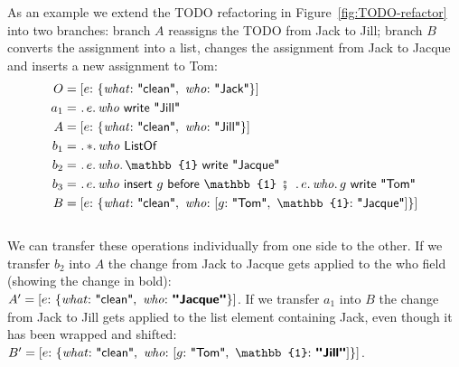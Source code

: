 \documentclass[english,submission]{programming}
\theoremstyle{definition}
\newcommand{\mathbox}[1]{\colorbox{black!10}{$#1$}}
\DeclareMathOperator{\exec}{\ \fatsemi\ \ }
\newcommand{\is}{{:}\ }
\newcommand{\comma}{,\ }
\newcommand{\quotedstring}[1]{\textsf{\textquotedbl{#1}\textquotedbl}}
\begin{document}
As an example we extend the TODO refactoring in Figure~\ref{fig:TODO-refactor} into two branches: branch $A$ reassigns the TODO from Jack to Jill; branch $B$ converts the assignment into a list, changes the assignment from Jack to Jacque and inserts a new assignment to Tom:
\begin{align*}
  O &= [
    e \is \{ \mathit{what}\is \quotedstring{clean}\comma  \mathit{who}\is \quotedstring{Jack} \}
    ] \\
  a_1 &= \ \ldotp e\ldotp\mathit{who}\textsf{ write } \quotedstring{Jill}\\
  A &= [
    e \is \{ \mathit{what}\is \quotedstring{clean}\comma  \mathit{who}\is \quotedstring{Jill} \}
    ] \\
  b_1 &= \ \ldotp *\ldotp \mathit{who} \textsf{ ListOf } \\
  b_2 &= \ \ldotp e\ldotp\mathit{who}\ldotp\mathbb{1} \textsf{ write } \quotedstring{Jacque} \\
  b_3 &= \ \ldotp e\ldotp\mathit{who} \textsf{ insert } g \textsf{ before } \mathbb{1} \exec \ldotp e\ldotp\mathit{who}\ldotp g \textsf{ write } \quotedstring{Tom} \\
  B &= [
    e \is \{ \mathit{what}\is \quotedstring{clean}\comma  \mathit{who}\is
    [ g \is \quotedstring{Tom} \comma \mathbb{1}\is \quotedstring{Jacque}] \}
    ] \\
  \end{align*}
  \vspace{-30pt}\\
We can transfer these operations individually from one side to the other.
If we transfer $b_2$ into $A$ the change from Jack to Jacque gets applied to the \textsf{who} field (showing the change in bold):\\
\mathbox{A' =
[e \is \{ \mathit{what}\is \quotedstring{clean}\comma  \mathit{who}\is \textbf{\quotedstring{Jacque}} \}]}.
If we transfer $a_1$ into $B$ the change from Jack to Jill gets applied to the list element containing Jack, even though it has been wrapped and shifted:\\
\mathbox{B' = [
    e \is \{ \mathit{what}\is \quotedstring{clean}\comma  \mathit{who}\is
    [ g \is \quotedstring{Tom} \comma \mathbb{1}\is \textbf{\quotedstring{Jill}}] \}
]}.

\end{document}
